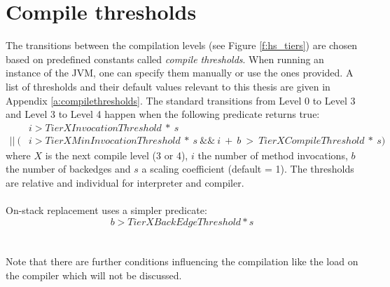 \section{Compile thresholds}
\label{s:compilethresholds}
The transitions between the compilation levels (see Figure \ref{f:hs_tiers}) are chosen based on predefined constants called \textit{compile thresholds}. When running an instance of the JVM, one can specify them manually or use the ones provided. A list of thresholds and their default values relevant to this thesis are given in Appendix \ref{a:compilethresholds}.
The standard transitions from Level 0 to Level 3 and Level 3 to Level 4 happen when the following predicate returns true:
\begin{align*}
& i > TierXInvocationThreshold \ * \ s \\
 || \ (&i > TierXMinInvocationThreshold \ * \ s \ \&\& \ i \ + \ b \ > \ TierXCompileThreshold \ * \ s) 
\end{align*}
where $X$ is the next compile level (3 or 4), $i$ the number of method invocations, $b$ the number of backedges and $s$ a scaling coefficient (default = 1).
The thresholds are relative and individual for interpreter and compiler.
\\\\
On-stack replacement uses a simpler predicate:
$$b > TierXBackEdgeThreshold * s$$
\\\\
Note that there are further conditions influencing the compilation like the load on the compiler which will not be discussed.
